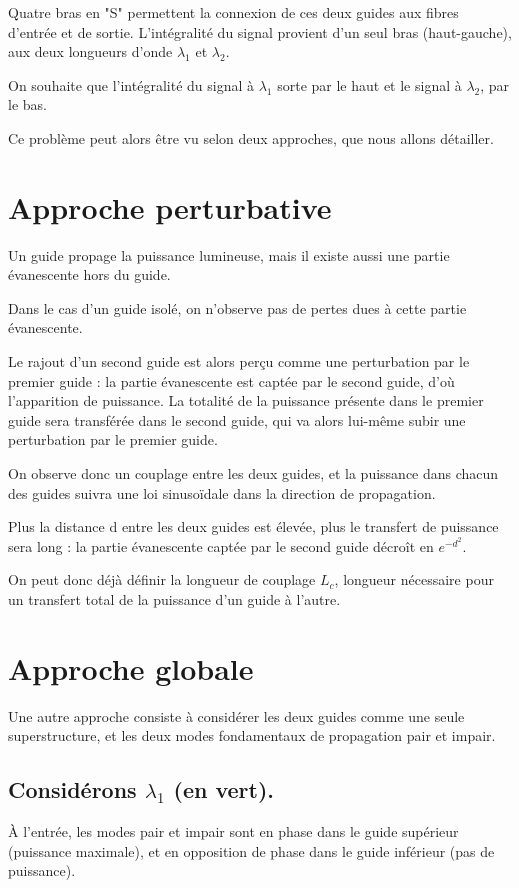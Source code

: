 \documentclass[a4paper,11pt]{report}
\begin{document}
Quatre bras en "S" permettent la connexion de ces deux guides aux fibres d'entrée et de sortie.
L'intégralité du signal provient d'un seul bras (haut-gauche), aux deux longueurs d'onde $\lambda_1$ et $\lambda_2$.

On souhaite que l'intégralité du signal à $\lambda_1$ sorte par le haut et le signal à $\lambda_2$, par le bas.

Ce problème peut alors être vu selon deux approches, que nous allons détailler.

\section{Approche perturbative}
Un guide propage la puissance lumineuse, mais il existe aussi une partie évanescente hors du guide.

Dans le cas d'un guide isolé, on n'observe pas de pertes dues à cette partie évanescente.

Le rajout d'un second guide est alors perçu comme une perturbation par le premier guide : la partie évanescente est captée par le second guide, d'où l'apparition de puissance. La totalité de la puissance présente dans le premier guide sera transférée dans le second guide, qui va alors lui-même subir une perturbation par le premier guide.

On observe donc un couplage entre les deux guides, et la puissance dans chacun des guides suivra une loi sinusoïdale dans la direction de propagation.

Plus la distance d entre les deux guides est élevée, plus le transfert de puissance sera long : la partie évanescente captée par le second guide décroît en $e^{-d^2}$.

On peut donc déjà définir la longueur de couplage $L_c$, longueur nécessaire pour un transfert total de la puissance d'un guide à l'autre.

\section{Approche globale}%
Une autre approche consiste à considérer les deux guides comme une seule superstructure, et les deux modes fondamentaux de propagation pair et impair.

\subsection*{Considérons $\lambda_1$ (en vert).}
À l'entrée, les modes pair et impair sont en phase dans le guide supérieur (puissance maximale), et en opposition de phase dans le guide inférieur (pas de puissance).
\end{document}
